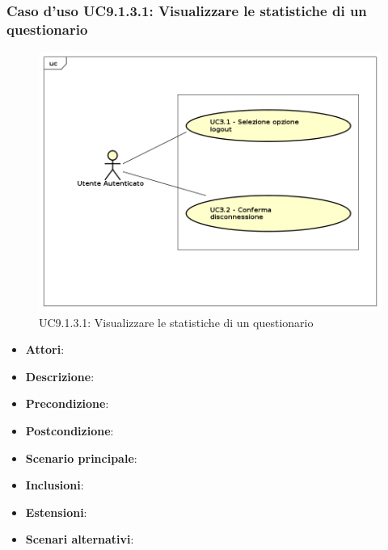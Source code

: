 				\subsubsection{Caso d'uso UC9.1.3.1: Visualizzare le statistiche di un questionario}
				\label{UC9.1.3.1}
				\begin{figure}[h]
					\centering
					\includegraphics[scale=0.7,keepaspectratio]{UML/UC9.png}
					\caption{UC9.1.3.1: Visualizzare le statistiche di un questionario}
				\end{figure}
				\FloatBarrier
				\begin{itemize}
					\item \textbf{Attori}: 
					\item \textbf{Descrizione}: 
					\item \textbf{Precondizione}: 
					\item \textbf{Postcondizione}: 
					\item \textbf{Scenario principale}:
					\item \textbf{Inclusioni}:
					\item \textbf{Estensioni}:
					\item \textbf{Scenari alternativi}:
				\end{itemize}
						

				
